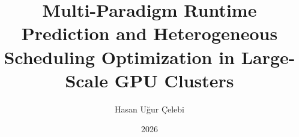 \documentclass[msc]{thesis}
\title{Multi-Paradigm Runtime Prediction and Heterogeneous Scheduling Optimization in Large-Scale GPU Clusters}
\author{Hasan Uğur Çelebi}
\date{2026}
\begin{document}
\MakeFrontMatter











\MakeReferences


\end{document}
